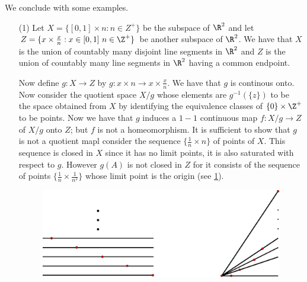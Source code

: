 We conclude with some examples.

\begin{example}
    \begin{enumerate}
        \item[(1)] Let $X=\{[0,1] \times n:n \in Z^+\}$ be the subspace of $\R^2$ and let  $Z=\{x \times
            \frac{x}{n}: x \in [0,1] \text{ } n \in \Z^+\}$ be another subspace of $\R^2$. We have
            that  $X$ is the union of countably many disjoint line segments in  $\R^2$ and  $Z$ is
            the union of countably many line segments in  $\R^2$ having a common endpoint.

            Now define $g:X \rightarrow Z$ by  $g:x \times n \rightarrow x \times \frac{x}{n}$. We
            have that $g$ is continous onto. Now consider the quotient space  $X/g$ whose elements
            are  $g^{-1}(\{z\})$ to be the space obtained from $X$ by identifying the equivalence
            classes of $\{0\} \times \Z^+$ to be points. Now we have that $g$ induces a  $1-1$
            continuous map  $f:X/g \rightarrow Z$ of  $X/g$ onto  $Z$; but  $f$ is not a
            homeomorphism. It is sufficient to show that  $g$ is not a quotient mapl consider the
            sequence  $\{\frac{1}{n} \times n\}$ of points of $X$. This sequence is closed in  $X$
            since it has no limit points, it is also saturated with respect to  $g$. However  $g(A)$
            is not closed in $Z$ for it consists of the sequence of points  $\{\frac{1}{n} \times
            \frac{1}{n^2}\}$ whose limit point is the origin (see \ref{fig_2.6}).

            \begin{figure}[h]
                \centering
                \includegraphics[scale = 0.5]{Figures/Chapter2/example_2_8(2).eps}
                \caption{}
                \label{fig_2.6}
            \end{figure}


\end{enumerate}
\end{example}
